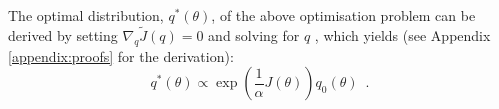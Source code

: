 The optimal distribution, $q^*(\theta)$, of the above optimisation problem can be derived by setting $\nabla_q \tilde{J}(q) = 0$ and solving for $q$ \citep{liu_svpg}, which yields (see Appendix \ref{appendix:proofs} for the derivation):
\renewcommand{\theequation}{4.6}
\begin{equation}
\label{eqn:optimal_q}
q^*(\theta) \propto \exp \left(\frac{1}{\alpha}J(\theta) \right)q_0(\theta) \enspace.
\end{equation}

